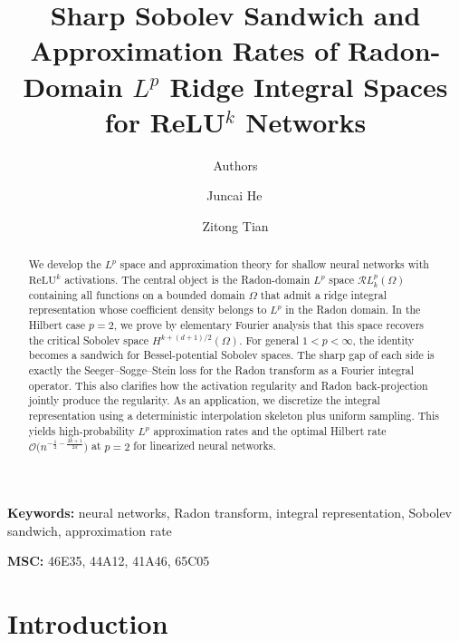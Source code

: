 \documentclass[12pt]{article}
\numberwithin{equation}{section}
\numberwithin{figure}{section}
\numberwithin{equation}{section}
\begin{document}
\title{Sharp Sobolev Sandwich and Approximation Rates of Radon-Domain $L^p$ Ridge Integral Spaces for ReLU$^k$ Networks}
\author{Authors}
\author{Juncai He\footnotemark[1] \,\footnotemark[2] \and  Zitong Tian\footnotemark[2]}
\date{}

\maketitle
\renewcommand{\thefootnote}{\fnsymbol{footnote}}


\begin{abstract}
We develop the $L^p$ space and approximation theory for shallow neural networks with $\mathrm{ReLU}^k$ activations. The central object is the Radon-domain $L^p$ space
$\mathcal{R}L^p_k(\Omega)$ containing all functions on a bounded domain
$\Omega$ that admit a ridge integral representation whose coefficient density
belongs to $L^p$ in the Radon domain.  In the Hilbert case
$p=2$, we prove by elementary Fourier analysis that this space recovers the
critical Sobolev space $H^{k+(d+1)/2}(\Omega)$. For general
$1<p<\infty$, the identity becomes a sandwich for Bessel-potential Sobolev spaces.
The sharp gap of each side is exactly the Seeger--Sogge--Stein loss for
the Radon transform as a Fourier integral operator. This also clarifies how the
activation regularity and Radon back-projection jointly produce the regularity.
As an application, we
discretize the integral representation using a deterministic interpolation 
skeleton plus uniform sampling. This yields high-probability $L^p$
approximation rates and the optimal Hilbert rate $\mathcal{O}\!\big(n^{-\frac12-\frac{2k+1}{2d}}\big)$ at $p=2$ for linearized neural networks.
\end{abstract}




\quad \textbf{Keywords:} neural networks, Radon transform, integral representation, Sobolev sandwich, approximation rate

\quad \textbf{MSC:}  46E35, 44A12, 41A46, 65C05



\section{Introduction}
\end{document}
